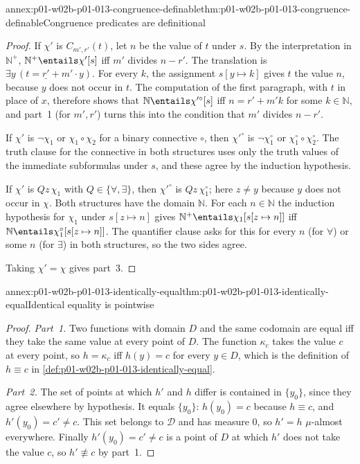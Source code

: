 \begin{annexitem}{annex:p01-w02b-p01-013-congruence-definable}{thm:p01-w02b-p01-013-congruence-definable}{Congruence predicates are definitional}
\begin{proof}
If \(\chi'\) is \(C_{m',r'}(t)\), let \(n\) be the value of \(t\) under
\(s\).  By the interpretation in \(\mathbb N^{+}\), \(\mathbb
N^{+}\entails\chi'[s]\) iff \(m'\) divides \(n-r'\).  The translation is
\(\exists y\,(t=\underline{r'}+m'\cdot y)\).  For every \(k\), the
assignment \(s[y\mapsto k]\) gives \(t\) the value \(n\), because \(y\) does
not occur in \(t\).  The computation of the first paragraph, with \(t\) in
place of \(x\), therefore shows that \(\mathbb N\entails\chi'^{\circ}[s]\)
iff \(n=r'+m'k\) for some \(k\in\mathbb N\), and part~1 (for \(m',r'\))
turns this into the condition that \(m'\) divides \(n-r'\).

If \(\chi'\) is \(\neg\chi_1\) or \(\chi_1\circ\chi_2\) for a binary
connective \(\circ\), then \(\chi'^{\circ}\) is \(\neg\chi_1^{\circ}\) or
\(\chi_1^{\circ}\circ\chi_2^{\circ}\).  The truth clause for the connective
in both structures uses only the truth values of the immediate subformulas
under \(s\), and these agree by the induction hypothesis.

If \(\chi'\) is \(Qz\,\chi_1\) with \(Q\in\{\forall,\exists\}\), then
\(\chi'^{\circ}\) is \(Qz\,\chi_1^{\circ}\); here \(z\neq y\) because \(y\)
does not occur in \(\chi\).  Both structures have the domain \(\mathbb N\).
For each \(n\in\mathbb N\) the induction hypothesis for \(\chi_1\) under
\(s[z\mapsto n]\) gives \(\mathbb N^{+}\entails\chi_1[s[z\mapsto n]]\) iff
\(\mathbb N\entails\chi_1^{\circ}[s[z\mapsto n]]\).  The quantifier clause
asks for this for every \(n\) (for \(\forall\)) or some \(n\) (for
\(\exists\)) in both structures, so the two sides agree.

Taking \(\chi'=\chi\) gives part~3.
\end{proof}
\end{annexitem}

\begin{annexitem}{annex:p01-w02b-p01-013-identically-equal}{thm:p01-w02b-p01-013-identically-equal}{Identical equality is pointwise}
\begin{proof}
\emph{Part~1.}  Two functions with domain \(D\) and the same codomain are
equal iff they take the same value at every point of \(D\).  The function
\(\kappa_c\) takes the value \(c\) at every point, so \(h=\kappa_c\) iff
\(h(y)=c\) for every \(y\in D\), which is the definition of \(h\equiv c\) in
\cref{def:p01-w02b-p01-013-identically-equal}.

\emph{Part~2.}  The set of points at which \(h'\) and \(h\) differ is
contained in \(\{y_0\}\), since they agree elsewhere by hypothesis.  It
equals \(\{y_0\}\): \(h(y_0)=c\) because \(h\equiv c\), and
\(h'(y_0)=c'\neq c\).  This set belongs to \(\mathcal D\) and has measure
\(0\), so \(h'=h\) \(\mu\)-almost everywhere.  Finally \(h'(y_0)=c'\neq c\)
is a point of \(D\) at which \(h'\) does not take the value \(c\), so
\(h'\not\equiv c\) by part~1.
\end{proof}
\end{annexitem}

